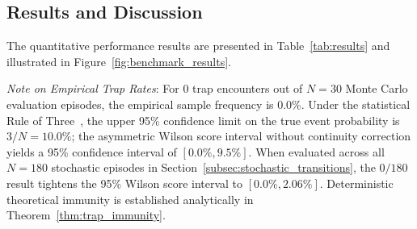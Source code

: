 \documentclass[11pt,a4paper]{article}
\begin{document}
\subsection{Results and Discussion}

The quantitative performance results are presented in Table~\ref{tab:results} and illustrated in Figure~\ref{fig:benchmark_results}.

\begin{table}[t]
\centering
\caption{Benchmark results on dynamic congested grids (30 evaluation episodes per configuration, backup budget $K=15$).}
\label{tab:results}
\vspace{0.3em}
\raggedright
\footnotesize{\textit{Note on Empirical Trap Rates}: For $0$ trap encounters out of $N=30$ Monte Carlo evaluation episodes, the empirical sample frequency is $0.0\%$. Under the statistical Rule of Three~\cite{jovanovic1997rule}, the upper 95\% confidence limit on the true event probability is $3/N = 10.0\%$; the asymmetric Wilson score interval without continuity correction yields a 95\% confidence interval of $[0.0\%, 9.5\%]$. When evaluated across all $N=180$ stochastic episodes in Section~\ref{subsec:stochastic_transitions}, the $0/180$ result tightens the 95\% Wilson score interval to $[0.0\%, 2.06\%]$. Deterministic theoretical immunity is established analytically in Theorem~\ref{thm:trap_immunity}.}
\end{table}
\end{document}
